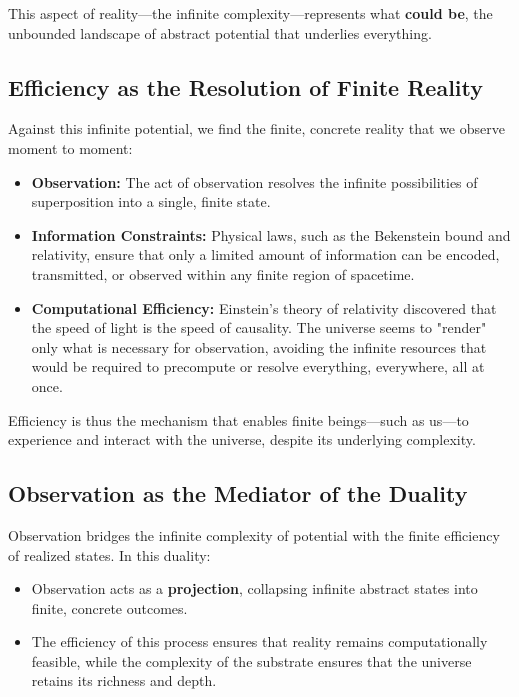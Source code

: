 \documentclass[12pt]{article}
\begin{document}
This aspect of reality—the infinite complexity—represents what \textbf{could be}, the unbounded landscape of abstract potential that underlies everything.

\subsection{Efficiency as the Resolution of Finite Reality}

Against this infinite potential, we find the finite, concrete reality that we observe moment to moment:
\begin{itemize}
    \item \textbf{Observation:} The act of observation resolves the infinite possibilities of superposition into a single, finite state.
    \item \textbf{Information Constraints:} Physical laws, such as the Bekenstein bound and relativity, ensure that only a limited amount of information can be encoded, transmitted, or observed within any finite region of spacetime.
    \item \textbf{Computational Efficiency:} Einstein's theory of relativity discovered that the speed of light is the speed of causality. The universe seems to "render" only what is necessary for observation, avoiding the infinite resources that would be required to precompute or resolve everything, everywhere, all at once.
\end{itemize}

Efficiency is thus the mechanism that enables finite beings—such as us—to experience and interact with the universe, despite its underlying complexity.

\subsection{Observation as the Mediator of the Duality}

Observation bridges the infinite complexity of potential with the finite efficiency of realized states. In this duality:
\begin{itemize}
    \item Observation acts as a \textbf{projection}, collapsing infinite abstract states into finite, concrete outcomes.
    \item The efficiency of this process ensures that reality remains computationally feasible, while the complexity of the substrate ensures that the universe retains its richness and depth.
\end{itemize}
\end{document}
